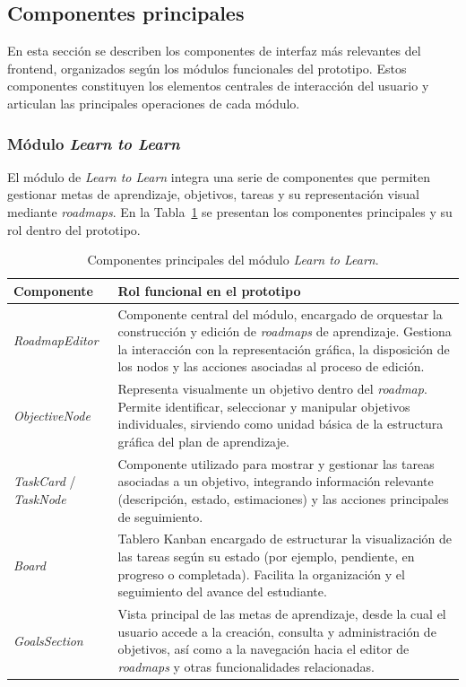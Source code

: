 \subsection{Componentes principales}

En esta sección se describen los componentes de interfaz más relevantes del frontend, organizados según los módulos funcionales del prototipo. Estos componentes constituyen los elementos centrales de interacción del usuario y articulan las principales operaciones de cada módulo.

\subsubsection{Módulo \textit{Learn to Learn}}

El módulo de \textit{Learn to Learn} integra una serie de componentes que permiten gestionar metas de aprendizaje, objetivos, tareas y su representación visual mediante \textit{roadmaps}. En la Tabla~\ref{tab:componentes-learn-to-learn} se presentan los componentes principales y su rol dentro del prototipo.

\begin{table}[H]
\centering
\footnotesize
\begin{tabular}{| m{3.5cm} | m{11cm} |}
\hline
\textbf{Componente} & \textbf{Rol funcional en el prototipo} \\
\hline
\textit{RoadmapEditor} & Componente central del módulo, encargado de orquestar la construcción y edición de \textit{roadmaps} de aprendizaje. Gestiona la interacción con la representación gráfica, la disposición de los nodos y las acciones asociadas al proceso de edición. \\
\hline
\textit{ObjectiveNode} & Representa visualmente un objetivo dentro del \textit{roadmap}. Permite identificar, seleccionar y manipular objetivos individuales, sirviendo como unidad básica de la estructura gráfica del plan de aprendizaje. \\
\hline
\textit{TaskCard} / \textit{TaskNode} & Componente utilizado para mostrar y gestionar las tareas asociadas a un objetivo, integrando información relevante (descripción, estado, estimaciones) y las acciones principales de seguimiento. \\
\hline
\textit{Board} & Tablero Kanban encargado de estructurar la visualización de las tareas según su estado (por ejemplo, pendiente, en progreso o completada). Facilita la organización y el seguimiento del avance del estudiante. \\
\hline
\textit{GoalsSection} & Vista principal de las metas de aprendizaje, desde la cual el usuario accede a la creación, consulta y administración de objetivos, así como a la navegación hacia el editor de \textit{roadmaps} y otras funcionalidades relacionadas. \\
\hline
\end{tabular}
\caption{Componentes principales del módulo \textit{Learn to Learn}.}
\label{tab:componentes-learn-to-learn}
\end{table}

